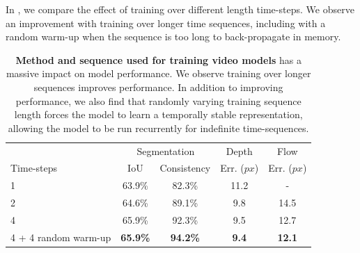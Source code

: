 In , we compare the effect of training over different length time-steps. We observe an improvement with training over longer time sequences, including with a random warm-up when the sequence is too long to back-propagate in memory.

\begin{table}[t]
\begin{center}
	\begin{tabular}{l|c|c|c|c}
    \hline
    & \multicolumn{2}{c|}{Segmentation} & Depth & Flow \\
    Time-steps & IoU & Consistency & Err. ($px$) & Err. ($px$) \\
		\hline\hline
         1 & 63.9\% & 82.3\% & 11.2 & - \\
		2 & 64.6\% & 89.1\% & 9.8 & 14.5 \\
		4 & 65.9\% & 92.3\% & 9.5 & 12.7 \\
		4 + 4 random warm-up &  \textbf{65.9\%} & \textbf{94.2\%} & \textbf{9.4} & \textbf{12.1} \\
		\hline
	\end{tabular}
\end{center}
\vspace{-2mm}
\caption[Method and sequence used for training video models.]{\textbf{Method and sequence used for training video models} has a massive impact on model performance. We observe training over longer sequences improves performance. In addition to improving performance, we also find that randomly varying training sequence length forces the model to learn a temporally stable representation, allowing the model to be run recurrently for indefinite time-sequences.}
\label{tbl:timesteps}
\vspace{-5mm}
\end{table}

